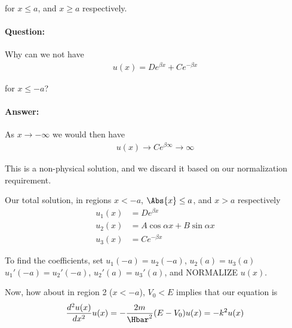 {for \(x \le a\), and \(x \ge a\) respectively.

\paragraph{Question:} Why can we not have
%
\begin{equation}\label{eqn:PHY356Lecture9:36}
\begin{aligned}
u(x) = D e^{\beta x} + C e^{-\beta x}
\end{aligned}
\end{equation}

for \(x \le -a\)?

\paragraph{Answer:} As \(x \rightarrow -\infty\) we would then have
%
\begin{equation}\label{eqn:lecture9boundStates:280}
\begin{aligned}
u(x) \rightarrow C e^{\beta \infty} \rightarrow \infty
\end{aligned}
\end{equation}

This is a non-physical solution, and we discard it based on our normalization requirement.

Our total solution, in regions \(x < -a\), \(\Abs{x} \le a\), and \(x > a\) respectively
%
\begin{equation}\label{eqn:lecture9boundStates:300}
\begin{aligned}
u_1(x) &= D e^{\beta x} \\
u_2(x) &= A \cos\alpha x + B \sin\alpha x \\
u_3(x) &= C e^{-\beta x}
\end{aligned}
\end{equation}

To find the coefficients, set \(u_1(-a) = u_2(-a)\), \(u_2(a) = u_3(a)\) \(u_1'(-a) = u_2'(-a)\), \(u_2'(a) = u_3'(a)\), and NORMALIZE \(u(x)\).

Now, how about in region 2 (\(x < -a\)), \(V_0 < E\) implies that our equation is
%
\begin{equation}\label{eqn:PHY356Lecture9:40}
\begin{aligned}
\frac{d^2 u(x)}{dx^2} u(x) = - \frac{2m}{\Hbar^2} (E - V_0) u(x) = - k^2 u(x)
\end{aligned}
\end{equation}

}

